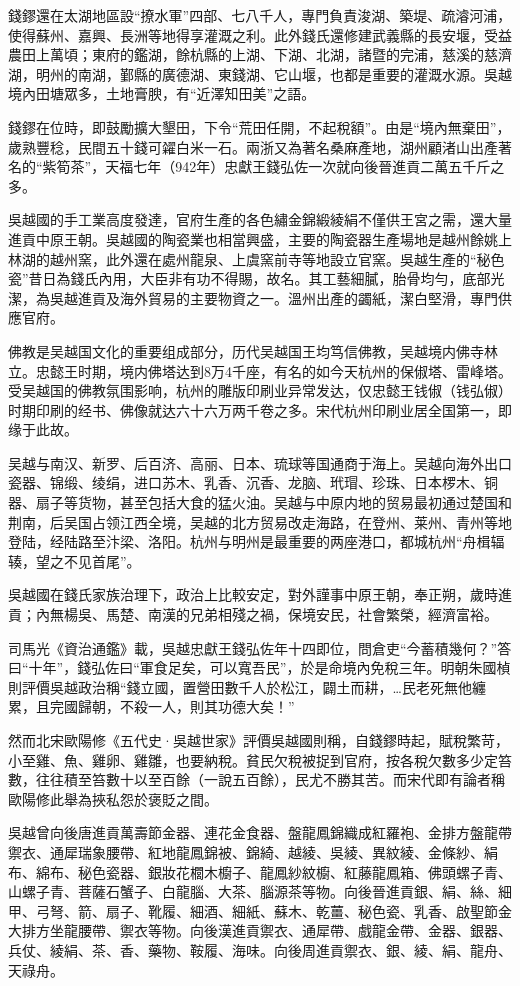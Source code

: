 錢鏐還在太湖地區設“撩水軍”四部、七八千人，專門負責浚湖、築堤、疏濬河浦，使得蘇州、嘉興、長洲等地得享灌溉之利。此外錢氏還修建武義縣的長安堰，受益農田上萬頃；東府的鑑湖，餘杭縣的上湖、下湖、北湖，諸暨的完浦，慈溪的慈濟湖，明州的南湖，鄞縣的廣德湖、東錢湖、它山堰，也都是重要的灌溉水源。吳越境內田塘眾多，土地膏腴，有“近澤知田美”之語。

錢鏐在位時，即鼓勵擴大墾田，下令“荒田任開，不起稅額”。由是“境內無棄田”，歲熟豐稔，民間五十錢可糴白米一石。兩浙又為著名桑麻產地，湖州顧渚山出產著名的“紫筍茶”，天福七年（942年）忠獻王錢弘佐一次就向後晉進貢二萬五千斤之多。

吳越國的手工業高度發達，官府生產的各色繡金錦緞綾絹不僅供王宮之需，還大量進貢中原王朝。吳越國的陶瓷業也相當興盛，主要的陶瓷器生產場地是越州餘姚上林湖的越州窯，此外還在處州龍泉、上虞窯前寺等地設立官窯。吳越生產的“秘色瓷”昔日為錢氏內用，大臣非有功不得賜，故名。其工藝細膩，胎骨均勻，底部光潔，為吳越進貢及海外貿易的主要物資之一。溫州出產的蠲紙，潔白堅滑，專門供應官府。

佛教是吴越国文化的重要组成部分，历代吴越国王均笃信佛教，吴越境内佛寺林立。忠懿王时期，境内佛塔达到8万4千座，有名的如今天杭州的保俶塔、雷峰塔。受吴越国的佛教氛围影响，杭州的雕版印刷业异常发达，仅忠懿王钱俶（钱弘俶）时期印刷的经书、佛像就达六十六万两千卷之多。宋代杭州印刷业居全国第一，即缘于此故。

吴越与南汉、新罗、后百济、高丽、日本、琉球等国通商于海上。吴越向海外出口瓷器、锦缎、绫绢，进口苏木、乳香、沉香、龙脑、玳瑁、珍珠、日本椤木、铜器、扇子等货物，甚至包括大食的猛火油。吴越与中原内地的贸易最初通过楚国和荆南，后吴国占领江西全境，吴越的北方贸易改走海路，在登州、莱州、青州等地登陆，经陆路至汴梁、洛阳。杭州与明州是最重要的两座港口，都城杭州“舟楫辐辏，望之不见首尾”。

吳越國在錢氏家族治理下，政治上比較安定，對外謹事中原王朝，奉正朔，歲時進貢；內無楊吳、馬楚、南漢的兄弟相殘之禍，保境安民，社會繁榮，經濟富裕。

司馬光《資治通鑑》載，吳越忠獻王錢弘佐年十四即位，問倉吏“今蓄積幾何？”答曰“十年”，錢弘佐曰“軍食足矣，可以寬吾民”，於是命境內免稅三年。明朝朱國楨則評價吳越政治稱“錢立國，置營田數千人於松江，闢土而耕，…民老死無他纏累，且完國歸朝，不殺一人，則其功德大矣！”

然而北宋歐陽修《五代史·吳越世家》評價吳越國則稱，自錢鏐時起，賦稅繁苛，小至雞、魚、雞卵、雞雛，也要納稅。貧民欠稅被捉到官府，按各稅欠數多少定笞數，往往積至笞數十以至百餘（一說五百餘），民尤不勝其苦。而宋代即有論者稱歐陽修此舉為挾私怨於褒貶之間。

吳越曾向後唐進貢萬壽節金器、連花金食器、盤龍鳳錦織成紅羅袍、金排方盤龍帶禦衣、通犀瑞象腰帶、紅地龍鳳錦被、錦綺、越綾、吳綾、異紋綾、金條紗、絹布、綿布、秘色瓷器、銀妝花櫚木櫥子、龍鳳紗紋櫥、紅藤龍鳳箱、佛頭螺子青、山螺子青、菩薩石蟹子、白龍腦、大茶、腦源茶等物。向後晉進貢銀、絹、絲、細甲、弓弩、箭、扇子、靴履、細酒、細紙、蘇木、乾薑、秘色瓷、乳香、啟聖節金大排方坐龍腰帶、禦衣等物。向後漢進貢禦衣、通犀帶、戲龍金帶、金器、銀器、兵仗、綾絹、茶、香、藥物、鞍履、海味。向後周進貢禦衣、銀、綾、絹、龍舟、天祿舟。

